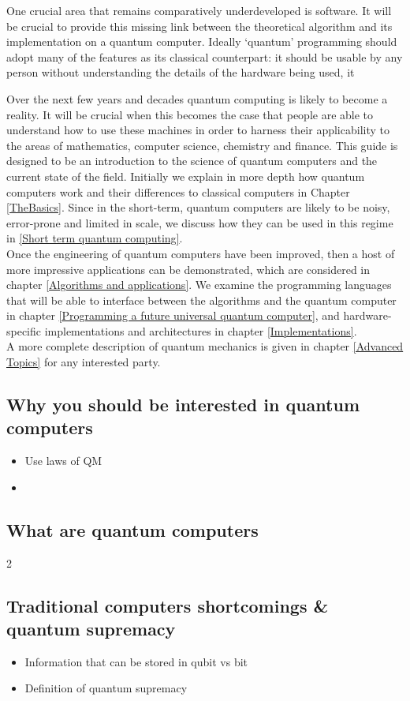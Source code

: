 One crucial area that remains comparatively underdeveloped is software. It will be crucial to provide this missing link between the theoretical algorithm and its implementation on a quantum computer. Ideally `quantum' programming should adopt many of the features as its classical counterpart: it should be usable by any person without understanding the details of the hardware being used, it 


Over the next few years and decades quantum computing is likely to become a reality. It will be crucial when this becomes the case that people are able to understand how to use these machines in order to harness their applicability to the areas of mathematics, computer science, chemistry and finance. This guide is designed to be an introduction to the science of quantum computers and the current state of the field. Initially we explain in more depth how quantum computers work and their differences to classical computers in Chapter \ref{TheBasics}. Since in the short-term, quantum computers are likely to be noisy, error-prone and limited in scale, we discuss how they can be used in this regime in \ref{Short term quantum computing}. \\

Once the engineering of quantum computers have been improved, then a host of more impressive applications can be demonstrated, which are considered in chapter \ref{Algorithms and applications}. We examine the programming languages that will be able to interface between the algorithms and the quantum computer in chapter \ref{Programming a future universal quantum computer}, and hardware-specific implementations and architectures in chapter \ref{Implementations}. \\

A more complete description of quantum mechanics is given in chapter \ref{Advanced Topics} for any interested party. 

\subsection{Why you should be interested in quantum computers}
\begin{itemize}
\item Use laws of QM
\item 
\end{itemize}


\subsection{What are quantum computers}
2

\subsection{Traditional computers shortcomings \& quantum supremacy}
\begin{itemize}
\item Information that can be stored in qubit vs bit
\item Definition of quantum supremacy
\end{itemize}
